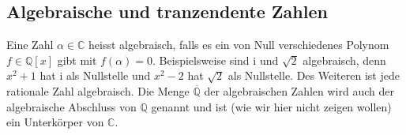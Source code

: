 \documentclass[../Analysis1_script.tex]{subfiles}
\begin{document}
\subsection{Algebraische und tranzendente Zahlen}
	Eine Zahl $\alpha \in \mathbb {C}$ heisst algebraisch, falls es ein von Null verschiedenes Polynom $f \in \mathbb {Q}[x]$ gibt mit $f(\alpha )=0$. Beispielsweise sind $\mathrm {i}$ und $\sqrt {2}$ algebraisch, denn $x^2+1$ hat $\mathrm {i}$ als Nullstelle und $x^2-2$ hat $\sqrt {2}$ als Nullstelle. Des Weiteren ist jede rationale Zahl algebraisch. Die Menge $\overline {\mathbb {Q}}$ der algebraischen Zahlen wird auch der algebraische Abschluss von $\mathbb {Q}$ genannt und ist (wie wir hier nicht zeigen wollen) ein Unterkörper von $\mathbb {C}$.	
	
\end{document}
